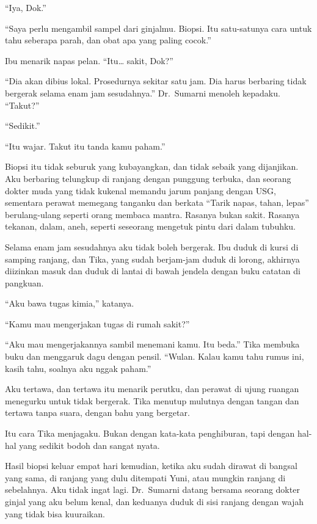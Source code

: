 \documentclass[11pt,twoside,openany]{book}
\makeatletter
\newcommand{\scenebreak}{\par\vspace{0.9em}{\centering\textsc{*\hspace{0.7em}*\hspace{0.7em}*}\par}\vspace{0.9em}\@afterindentfalse\@afterheading}
\makeatother
\begin{document}
``Iya, Dok.''

``Saya perlu mengambil sampel dari ginjalmu. Biopsi. Itu satu-satunya cara untuk tahu seberapa parah, dan obat apa yang paling cocok.''

Ibu menarik napas pelan. ``Itu\ldots{} sakit, Dok?''

``Dia akan dibius lokal. Prosedurnya sekitar satu jam. Dia harus berbaring tidak bergerak selama enam jam sesudahnya.'' Dr.~Sumarni menoleh kepadaku. ``Takut?''

``Sedikit.''

``Itu wajar. Takut itu tanda kamu paham.''

\scenebreak
Biopsi itu tidak seburuk yang kubayangkan, dan tidak sebaik yang dijanjikan. Aku berbaring telungkup di ranjang dengan punggung terbuka, dan seorang dokter muda yang tidak kukenal memandu jarum panjang dengan USG, sementara perawat memegang tanganku dan berkata ``Tarik napas, tahan, lepas'' berulang-ulang seperti orang membaca mantra. Rasanya bukan sakit. Rasanya tekanan, dalam, aneh, seperti seseorang mengetuk pintu dari dalam tubuhku.

Selama enam jam sesudahnya aku tidak boleh bergerak. Ibu duduk di kursi di samping ranjang, dan Tika, yang sudah berjam-jam duduk di lorong, akhirnya diizinkan masuk dan duduk di lantai di bawah jendela dengan buku catatan di pangkuan.

``Aku bawa tugas kimia,'' katanya.

``Kamu mau mengerjakan tugas di rumah sakit?''

``Aku mau mengerjakannya sambil menemani kamu. Itu beda.'' Tika membuka buku dan menggaruk dagu dengan pensil. ``Wulan. Kalau kamu tahu rumus ini, kasih tahu, soalnya aku nggak paham.''

Aku tertawa, dan tertawa itu menarik perutku, dan perawat di ujung ruangan menegurku untuk tidak bergerak. Tika menutup mulutnya dengan tangan dan tertawa tanpa suara, dengan bahu yang bergetar.

Itu cara Tika menjagaku. Bukan dengan kata-kata penghiburan, tapi dengan hal-hal yang sedikit bodoh dan sangat nyata.

\scenebreak
Hasil biopsi keluar empat hari kemudian, ketika aku sudah dirawat di bangsal yang sama, di ranjang yang dulu ditempati Yuni, atau mungkin ranjang di sebelahnya. Aku tidak ingat lagi. Dr.~Sumarni datang bersama seorang dokter ginjal yang aku belum kenal, dan keduanya duduk di sisi ranjang dengan wajah yang tidak bisa kuuraikan.
\end{document}
